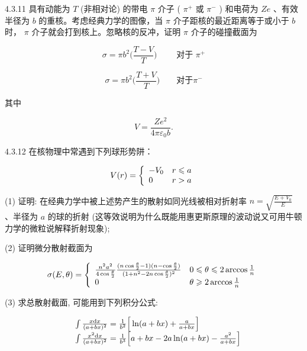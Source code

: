 \begin{problem}{4.3.11}
具有动能为 $T$ (非相对论) 的带电 $\pi$ 介子 ( $\pi^{+}$ 或 $\pi^{-}$ ) 和电荷为 $Ze$ 、有效半径为 $b$ 的重核。考虑经典力学的图像，当 $\pi$ 介子距核的最近距离等于或小于 $b$ 时， $\pi$ 介子就会打到核上。忽略核的反冲，证明 $\pi$ 介子的碰撞截面为

\[
\sigma = \pi b ^ {2} \Big (\frac {T - V}{T} \Big) \qquad \text { 对于 } \pi^ {+}
\]

\[
\sigma = \pi b ^ {2} \Big (\frac {T + V}{T} \Big) \qquad \text {对于} \pi^ {-}
\]

其中

\[
V = \frac {Z e ^ {2}}{4 \pi \varepsilon_ {0} b}.
\]
\end{problem}
\clearpage


\begin{problem}{4.3.12}
在核物理中常遇到下列球形势阱：

\[
V (r) = \left\{ \begin{array}{l l} - V _ {0} & r \leqslant a \\ 0 & r > a \end{array} \right.
\]

(1) 证明: 在经典力学中被上述势产生的散射如同光线被相对折射率 $n = \sqrt{\frac{E + V_0}{E}}$ 、半径为 $a$ 的球的折射 (这等效说明为什么既能用惠更斯原理的波动说又可用牛顿力学的微粒说解释折射现象);

(2) 证明微分散射截面为

\[
\sigma (E, \theta) = \left\{ \begin{array}{l l} \frac {n ^ {2} a ^ {2}}{4 \cos \frac {\theta}{2}} \frac {(n \cos \frac {\theta}{2} - 1) (n - \cos \frac {\theta}{2})}{(1 + n ^ {2} - 2 n \cos \frac {\theta}{2}) ^ {2}} & 0 \leqslant \theta \leqslant 2 \arccos \frac {1}{n} \\ 0 & \theta \geqslant 2 \arccos \frac {1}{n} \end{array} \right.
\]

(3) 求总散射截面, 可能用到下列积分公式:

\[
\begin{array}{r l} & {\int \frac {x \mathrm{d} x}{(a + b x) ^ {2}} = \frac {1}{b ^ {2}} \Big [ \ln (a + b x) + \frac {a}{a + b x} \Big ]} \\ & {\int \frac {x ^ {2} \mathrm{d} x}{(a + b x) ^ {2}} = \frac {1}{b ^ {3}} \Big [ a + b x - 2 a \ln (a + b x) - \frac {a ^ {2}}{a + b x} \Big ]} \end{array}
\]
\end{problem}
\clearpage


